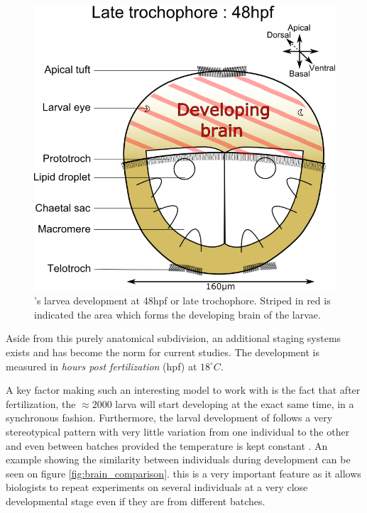 \begin{figure}[bth]
\begin{center}
  \includegraphics[width=0.6\linewidth]{gfx/chapter1/larvae48hpf.png}
\end{center}
  \caption{\platyfull{}'s larvea development at 48hpf or late trochophore. Striped in red is indicated the area which forms the developing brain of the larvae.}
  \label{fig:platynereis_larvae_scheme}
\end{figure}
    
    Aside from this purely anatomical subdivision, an additional staging systems exists and has become the norm for current studies. The development is measured in \textit{hours post fertilization} (hpf) at $18^{\circ}C$.
    
    A key factor making \platy{} such an interesting model to work with is the fact that after fertilization, the $\approx 2000$ larva will start developing at the exact same time, in a synchronous fashion. Furthermore, the larval development of \platy{} follows a very stereotypical pattern with very little variation from one individual to the other and even between batches provided the temperature is kept constant \cite{fischer04,dorresteijn90}. An example showing the similarity between individuals during development can be seen on figure \ref{fig:brain_comparison}. this is a very important feature as it allows biologists to repeat experiments on several individuals at a very close developmental stage even if they are from different batches.\\
    
